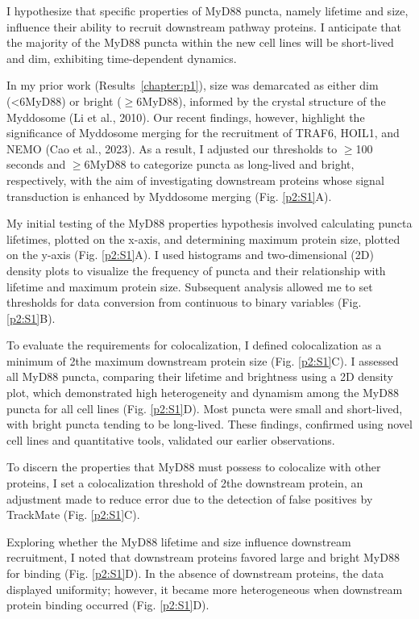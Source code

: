 I hypothesize that specific properties of MyD88 puncta, namely lifetime and size, influence their ability to recruit downstream pathway proteins. I anticipate that the majority of the MyD88 puncta within the new cell lines will be short-lived and dim, exhibiting time-dependent dynamics.

In my prior work (Results~\ref{chapter:p1}), size was demarcated as either dim (<6\times MyD88) or bright ($\geq$6\times MyD88), informed by the crystal structure of the Myddosome (Li et al., 2010). Our recent findings, however, highlight the significance of Myddosome merging for the recruitment of TRAF6, HOIL1, and NEMO (Cao et al., 2023). As a result, I adjusted our thresholds to $\geq$100 seconds and $\geq$6\times MyD88 to categorize puncta as long-lived and bright, respectively, with the aim of investigating downstream proteins whose signal transduction is enhanced by Myddosome merging (Fig. \ref{p2:S1}A).

My initial testing of the MyD88 properties hypothesis involved calculating puncta lifetimes, plotted on the x-axis, and determining maximum protein size, plotted on the y-axis (Fig. \ref{p2:S1}A). I used histograms and two-dimensional (2D) density plots to visualize the frequency of puncta and their relationship with lifetime and maximum protein size. Subsequent analysis allowed me to set thresholds for data conversion from continuous to binary variables (Fig. \ref{p2:S1}B).

To evaluate the requirements for colocalization, I defined colocalization as a minimum of 2\times the maximum downstream protein size (Fig. \ref{p2:S1}C). I assessed all MyD88 puncta, comparing their lifetime and brightness using a 2D density plot, which demonstrated high heterogeneity and dynamism among the MyD88 puncta for all cell lines (Fig. \ref{p2:S1}D). Most puncta were small and short-lived, with bright puncta tending to be long-lived. These findings, confirmed using novel cell lines and quantitative tools, validated our earlier observations.

To discern the properties that MyD88 must possess to colocalize with other proteins, I set a colocalization threshold of 2\times the downstream protein, an adjustment made to reduce error due to the detection of false positives by TrackMate (Fig. \ref{p2:S1}C).

Exploring whether the MyD88 lifetime and size influence downstream recruitment, I noted that downstream proteins favored large and bright MyD88 for binding (Fig. \ref{p2:S1}D). In the absence of downstream proteins, the data displayed uniformity; however, it became more heterogeneous when downstream protein binding occurred (Fig. \ref{p2:S1}D).

